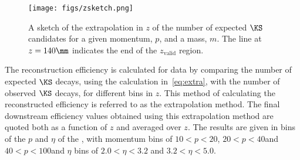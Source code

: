 \begin{figure}[h]
\centering
\texttt{[image: figs/zsketch.png]}
\caption{A sketch of the extrapolation in $z$ of the number of expected $\KS$ candidates for a given momentum, $p$, and a mass, $m$. The line at $z = 140\mm$ indicates the end of the $z_{\mathrm{valid}}$ region.}
\label{fig:sketch}
\end{figure}

The reconstruction efficiency is calculated for data by comparing the number of expected $\KS$ decays, using the calculation in~\autoref{eq:extra}, with the number of observed $\KS$ decays, for different bins in $z$. This method of calculating the reconstructed efficiency is referred to as the extrapolation method. The final downstream efficiency values obtained using this extrapolation method are quoted both as a function of $z$ and averaged over $z$. The results are given in bins of the $p$ and $\eta$ of the \KS, with momentum bins of $10<p<20$\gevc, $20<p<40$\gevc and $40<p<100$\gevc and $\eta$ bins of $2.0<\eta<3.2$ and $3.2<\eta<5.0$.









